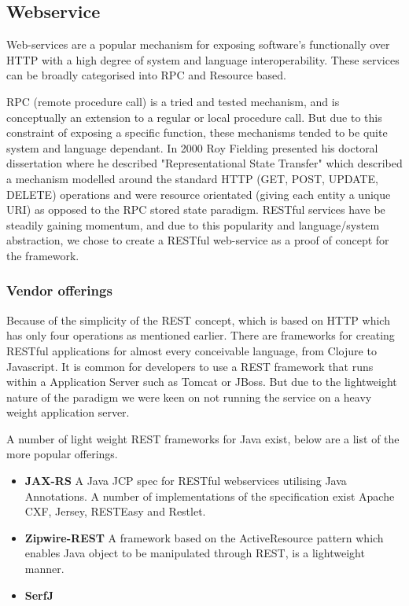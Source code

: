 \documentclass[pdftex,11pt,a4paper]{article}
\begin{document}
\subsection{Webservice}

Web-services are a popular mechanism for exposing software’s functionally over HTTP with a high degree of system and language interoperability. These services can be broadly categorised into RPC and Resource based.

RPC (remote procedure call) is a tried and tested mechanism, and is conceptually an extension to a regular or local procedure call. But due to this constraint of exposing a specific function, these mechanisms tended to be quite system and language dependant. In 2000 Roy Fielding presented his doctoral dissertation where he described "Representational State Transfer"\cite{REST} which described a mechanism modelled around the standard HTTP (GET, POST, UPDATE, DELETE) operations and were resource orientated (giving each entity a unique URI) as opposed to the RPC stored state paradigm. RESTful services have be steadily gaining momentum, and due to this popularity and language/system abstraction, we chose to create a RESTful web-service as a proof of concept for the framework.

\subsubsection{Vendor offerings}
Because of the simplicity of the REST concept, which is based on HTTP which has only four operations as mentioned earlier. There are frameworks for creating RESTful applications for almost every conceivable language, from Clojure\cite{website:compojure-rest} to Javascript\cite{website:persevere}. It is common for developers to use a REST framework that runs within a Application Server such as Tomcat\cite{website:tomcat} or JBoss\cite{website:jboss}. But due to the lightweight nature of the paradigm we were keen on not running the service on a heavy weight application server.

A number of light weight REST frameworks for Java exist, below are a list of the more popular offerings.

\begin{itemize}
	\item \textbf{JAX-RS} A Java JCP spec for RESTful webservices utilising Java Annotations. A number of implementations of the specification exist Apache CXF, Jersey, RESTEasy and Restlet.
	\item \textbf{Zipwire-REST} A framework based on the ActiveResource pattern which enables Java object to be manipulated through REST, is a lightweight manner.
	\item \textbf{SerfJ}
\end{itemize}
\end{document}
